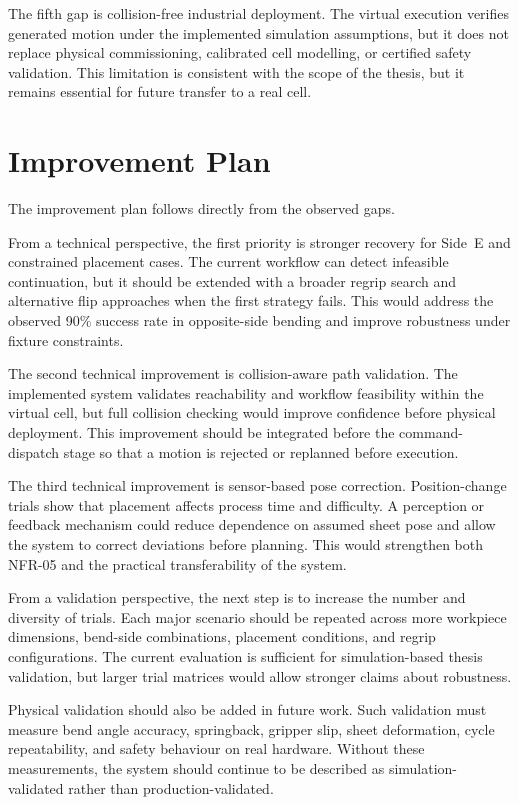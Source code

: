 The fifth gap is collision-free industrial deployment. The virtual execution verifies generated motion under the implemented simulation assumptions, but it does not replace physical commissioning, calibrated cell modelling, or certified safety validation. This limitation is consistent with the scope of the thesis, but it remains essential for future transfer to a real cell.

\section{Improvement Plan}
\label{sec:improvement-plan}

The improvement plan follows directly from the observed gaps.

From a technical perspective, the first priority is stronger recovery for Side~E and constrained placement cases. The current workflow can detect infeasible continuation, but it should be extended with a broader regrip search and alternative flip approaches when the first strategy fails. This would address the observed 90\% success rate in opposite-side bending and improve robustness under fixture constraints.

The second technical improvement is collision-aware path validation. The implemented system validates reachability and workflow feasibility within the virtual cell, but full collision checking would improve confidence before physical deployment. This improvement should be integrated before the command-dispatch stage so that a motion is rejected or replanned before execution.

The third technical improvement is sensor-based pose correction. Position-change trials show that placement affects process time and difficulty. A perception or feedback mechanism could reduce dependence on assumed sheet pose and allow the system to correct deviations before planning. This would strengthen both NFR-05 and the practical transferability of the system.

From a validation perspective, the next step is to increase the number and diversity of trials. Each major scenario should be repeated across more workpiece dimensions, bend-side combinations, placement conditions, and regrip configurations. The current evaluation is sufficient for simulation-based thesis validation, but larger trial matrices would allow stronger claims about robustness.

Physical validation should also be added in future work. Such validation must measure bend angle accuracy, springback, gripper slip, sheet deformation, cycle repeatability, and safety behaviour on real hardware. Without these measurements, the system should continue to be described as simulation-validated rather than production-validated.

